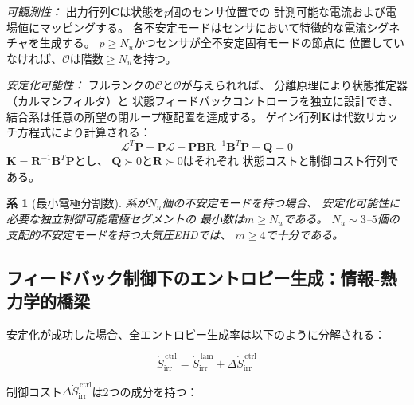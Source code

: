 \documentclass[12pt,twocolumn]{ltjsarticle}
\newtheorem{corollary}[theorem]{系}
\newcommand{\kk}{\mathbf{K}}
\newcommand{\Lop}{\mathcal{L}}
\newcommand{\Sdot}{\dot{S}_{\mathrm{irr}}}
\begin{document}
\textit{可観測性：}
出力行列$\mathbf{C}$は状態を$p$個のセンサ位置での
計測可能な電流および電場値にマッピングする。
各不安定モードはセンサにおいて特徴的な電流シグネチャを生成する。
$p \geq N_u$かつセンサが全不安定固有モードの節点に
位置していなければ、$\mathcal{O}$は階数$\geq N_u$を持つ。

\textit{安定化可能性：}
フルランクの$\mathcal{C}$と$\mathcal{O}$が与えられれば、
分離原理により状態推定器（カルマンフィルタ）と
状態フィードバックコントローラを独立に設計でき、
結合系は任意の所望の閉ループ極配置を達成する\cite{Anderson1990}。
ゲイン行列$\kk$は代数リカッチ方程式により計算される：
\begin{equation}
  \Lop^T \mathbf{P} + \mathbf{P}\Lop
  - \mathbf{P}\mathbf{B}\mathbf{R}^{-1}\mathbf{B}^T\mathbf{P}
  + \mathbf{Q} = 0
  \label{eq:riccati}
\end{equation}
$\kk = \mathbf{R}^{-1}\mathbf{B}^T\mathbf{P}$とし、
$\mathbf{Q} \succ 0$と$\mathbf{R} \succ 0$はそれぞれ
状態コストと制御コスト行列である。

\begin{corollary}[最小電極分割数]
\label{cor:min_electrodes}
系が$N_u$個の不安定モードを持つ場合、
安定化可能性に必要な独立制御可能電極セグメントの
最小数は$m \geq N_u$である。
$N_u \sim 3$--$5$個の支配的不安定モードを持つ大気圧EHDでは、
$m \geq 4$で十分である。
\end{corollary}

\subsection{フィードバック制御下のエントロピー生成：情報-熱力学的橋梁}
\label{sec:stability:entropy_ctrl}

安定化が成功した場合、全エントロピー生成率は以下のように分解される：

\begin{equation}
  \Sdot^{\,\mathrm{ctrl}}
  = \Sdot^{\,\mathrm{lam}} + \Delta\Sdot^{\,\mathrm{ctrl}}
  \label{eq:entropy_decomp}
\end{equation}

制御コスト$\Delta\Sdot^{\,\mathrm{ctrl}}$は2つの成分を持つ：
\end{document}
